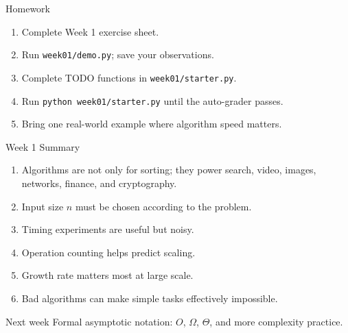 \documentclass[aspectratio=169,xcolor=dvipsnames]{beamer}
\begin{document}
\begin{frame}{Homework}
  \begin{enumerate}
    \item Complete Week 1 exercise sheet.
    \item Run \texttt{week01/demo.py}; save your observations.
    \item Complete TODO functions in \texttt{week01/starter.py}.
    \item Run \texttt{python week01/starter.py} until the auto-grader passes.
    \item Bring one real-world example where algorithm speed matters.
  \end{enumerate}
\end{frame}

\begin{frame}{Week 1 Summary}
  \begin{enumerate}
    \item Algorithms are not only for sorting; they power search, video, images, networks, finance, and cryptography.
    \item Input size $n$ must be chosen according to the problem.
    \item Timing experiments are useful but noisy.
    \item Operation counting helps predict scaling.
    \item Growth rate matters most at large scale.
    \item Bad algorithms can make simple tasks effectively impossible.
  \end{enumerate}
  \vspace{0.5em}
  \begin{block}{Next week}
    Formal asymptotic notation: $O$, $\Omega$, $\Theta$, and more complexity practice.
  \end{block}
\end{frame}
\end{document}
